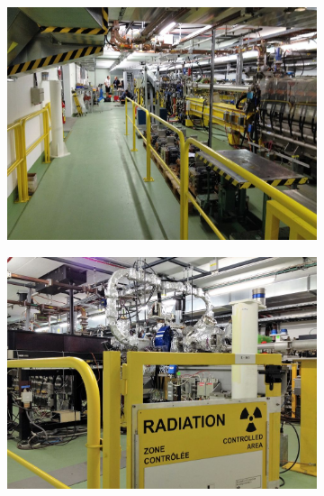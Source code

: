 \begin{figure}[tph]
	\centering
    \begin{subfigure}{0.47\textwidth}
		\centering
		\includegraphics[width=\linewidth]{images/CLIC-CTF3-overview}
    \end{subfigure}
	\hfill
    \begin{subfigure}{0.47\linewidth}
		\centering
		\includegraphics[width=\linewidth]{images/CLIC-CTF3-radiation}
    \end{subfigure}
	\par\bigskip
    \begin{subfigure}{0.47\linewidth}
		\centering

\end{subfigure}
\end{figure}
